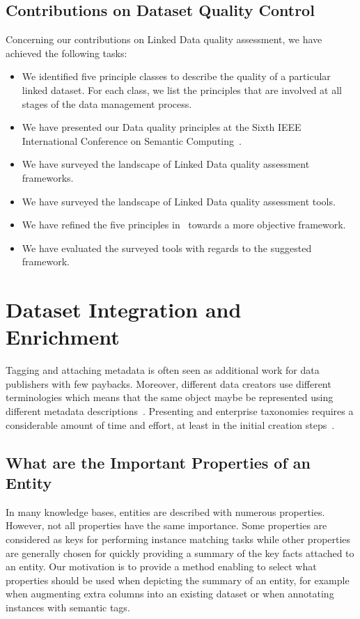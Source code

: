 \documentclass[onecolumn, crcready]{../../Util/LaTEX/iosart2c}
\begin{document}
\subsection{Contributions on Dataset Quality Control}
Concerning our contributions on Linked Data quality assessment, we have achieved the following tasks:
\begin{itemize}
\item We identified five principle classes to describe the quality of a particular linked dataset. For each class, we list the principles that are involved at all stages of the data management process.
\item We have presented our Data quality principles at the Sixth IEEE International Conference on Semantic Computing~\cite{Assaf:DQMST:12}.
\item We have surveyed the landscape of Linked Data quality assessment frameworks.
\item We have surveyed the landscape of Linked Data quality assessment tools.
\item We have refined the five principles in~\cite{Assaf:DQMST:12} towards a more objective framework.
\item We have evaluated the surveyed tools with regards to the suggested framework.
\end{itemize}


\section{Dataset Integration and Enrichment}
\label{sec:dataset_integration_and_enrichment}

Tagging and attaching metadata is often seen as additional work for data publishers with few paybacks. Moreover, different data creators use different terminologies which means that the same object maybe be represented using different metadata descriptions~\cite{Furnas:ACM:87}. Presenting and enterprise taxonomies requires a considerable amount of time and effort, at least in the initial creation steps~\cite{Frischmuth:SemWebJorunal:12}.

\subsection{What are the Important Properties of an Entity}
In many knowledge bases, entities are described with numerous properties. However, not all properties have the same importance. Some properties are considered as keys for performing instance matching tasks while other properties are generally chosen for quickly providing a summary of the key facts attached to an entity. Our motivation is to provide a method enabling to select what properties should be used when depicting the summary of an entity, for example when augmenting extra columns into an existing dataset or when annotating instances with semantic tags.
\end{document}

